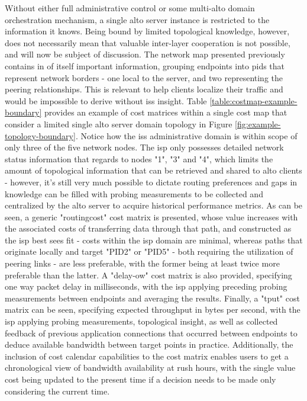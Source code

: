     Without either full administrative control or some multi-\gls{alto} domain orchestration mechanism, a single \gls{alto} server instance is restricted to the information it knows.
    Being bound by limited topological knowledge, however, does not necessarily mean that valuable inter-layer cooperation is not possible, and will now be subject of discussion.
    The network map presented previously contains in of itself important information, grouping endpoints into \glspl{pid} that represent network borders - one local to the server, and two representing the peering relationships.
    This is relevant to help clients localize their traffic and would be impossible to derive without \glspl{is} insight.
    Table \ref{table:costmap-example-boundary} provides an example of cost matrices within a single cost map that consider a limited single \gls{alto} server domain topology in Figure \ref{fig:example-topology-boundary}.
    Notice how the \glspl{is} administrative domain is within scope of only three of the five network nodes.
    The \gls{isp} only possesses detailed network status information that regards to nodes "1", "3" and "4", which limits the amount of topological information that can be retrieved and shared to \gls{alto} clients - however, it's still very much possible to dictate routing preferences and gaps in knowledge can be filled with probing measurements to be collected and centralized by the \gls{alto} server to acquire historical performance metrics.
    As can be seen, a generic "routingcost" cost matrix is presented, whose value increases with the associated costs of transferring data through that path, and constructed as the \gls{isp} best sees fit - costs within the \gls{isp} domain are minimal, whereas paths that originate locally and target "PID2" or "PID5" - both requiring the utilization of peering links - are less preferable, with the former being at least twice more preferable than the latter.
    A "delay-ow" cost matrix is also provided, specifying one way packet delay in milliseconds, with the \gls{isp} applying preceding probing measurements between endpoints and averaging the results.
    Finally, a "tput" cost matrix can be seen, specifying expected throughput in bytes per second, with the \gls{isp} applying probing measurements, topological insight, as well as collected feedback of previous application connections that occurred between endpoints to deduce available bandwidth between target points in practice.
    Additionally, the inclusion of cost calendar capabilities to the cost matrix enables users to get a chronological view of bandwidth availability at rush hours, with the single value cost being updated to the present time if a decision needs to be made only considering the current time.
